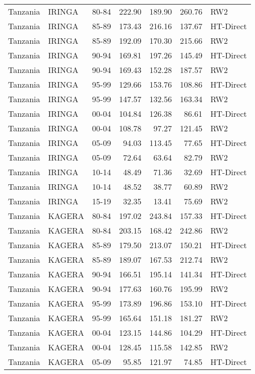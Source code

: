 \begin{longtable}{lllrrrl}
  Tanzania & IRINGA & 80-84 & 222.90 & 189.90 & 260.76 & RW2 \\ 
  Tanzania & IRINGA & 85-89 & 173.43 & 216.16 & 137.67 & HT-Direct \\ 
  Tanzania & IRINGA & 85-89 & 192.09 & 170.30 & 215.66 & RW2 \\ 
  Tanzania & IRINGA & 90-94 & 169.81 & 197.26 & 145.49 & HT-Direct \\ 
  Tanzania & IRINGA & 90-94 & 169.43 & 152.28 & 187.57 & RW2 \\ 
  Tanzania & IRINGA & 95-99 & 129.66 & 153.76 & 108.86 & HT-Direct \\ 
  Tanzania & IRINGA & 95-99 & 147.57 & 132.56 & 163.34 & RW2 \\ 
  Tanzania & IRINGA & 00-04 & 104.84 & 126.38 & 86.61 & HT-Direct \\ 
  Tanzania & IRINGA & 00-04 & 108.78 & 97.27 & 121.45 & RW2 \\ 
  Tanzania & IRINGA & 05-09 & 94.03 & 113.45 & 77.65 & HT-Direct \\ 
  Tanzania & IRINGA & 05-09 & 72.64 & 63.64 & 82.79 & RW2 \\ 
  Tanzania & IRINGA & 10-14 & 48.49 & 71.36 & 32.69 & HT-Direct \\ 
  Tanzania & IRINGA & 10-14 & 48.52 & 38.77 & 60.89 & RW2 \\ 
  Tanzania & IRINGA & 15-19 & 32.35 & 13.41 & 75.69 & RW2 \\ 
  Tanzania & KAGERA & 80-84 & 197.02 & 243.84 & 157.33 & HT-Direct \\ 
  Tanzania & KAGERA & 80-84 & 203.15 & 168.42 & 242.86 & RW2 \\ 
  Tanzania & KAGERA & 85-89 & 179.50 & 213.07 & 150.21 & HT-Direct \\ 
  Tanzania & KAGERA & 85-89 & 189.07 & 167.53 & 212.74 & RW2 \\ 
  Tanzania & KAGERA & 90-94 & 166.51 & 195.14 & 141.34 & HT-Direct \\ 
  Tanzania & KAGERA & 90-94 & 177.63 & 160.76 & 195.99 & RW2 \\ 
  Tanzania & KAGERA & 95-99 & 173.89 & 196.86 & 153.10 & HT-Direct \\ 
  Tanzania & KAGERA & 95-99 & 165.64 & 151.18 & 181.27 & RW2 \\ 
  Tanzania & KAGERA & 00-04 & 123.15 & 144.86 & 104.29 & HT-Direct \\ 
  Tanzania & KAGERA & 00-04 & 128.45 & 115.58 & 142.85 & RW2 \\ 
  Tanzania & KAGERA & 05-09 & 95.85 & 121.97 & 74.85 & HT-Direct \\ 

\end{longtable}

